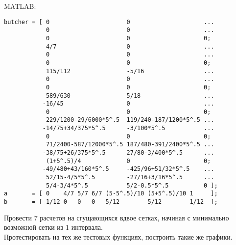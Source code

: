 \documentclass{article}
\begin{document}
\begin{enumerate}
\begin{verbatim}
\end{verbatim}
\newpage
MATLAB:
\begin{matlablisting}
	\begin{verbatim}
butcher = [ 0                      0                     ...
            0                      0                     ...
            0                      0                     0;
            4/7                    0                     ...
            0                      0                     ... 
            0                      0                     0;
            115/112                -5/16                 ...  
            0                      0                     ...
            0                      0                     0;
            589/630                5/18                  ...
           -16/45                  0                     ...
            0                      0                     0;
            229/1200-29/6000*5^.5  119/240-187/1200*5^.5 ...
           -14/75+34/375*5^.5      -3/100*5^.5           ...        
            0                      0                     0;
            71/2400-587/12000*5^.5 187/480-391/2400*5^.5 ...
           -38/75+26/375*5^.5      27/80-3/400*5^.5      ...
            (1+5^.5)/4             0                     0;
           -49/480+43/160*5^.5     -425/96+51/32*5^.5    ...   
            52/15-4/5*5^.5         -27/16+3/16*5^.5      ...
            5/4-3/4*5^.5           5/2-0.5*5^.5          0 ];
a       = [ 0    4/7 5/7 6/7 (5-5^.5)/10 (5+5^.5)/10 1     ];
b       = [ 1/12 0   0   0   5/12        5/12        1/12  ];
	\end{verbatim}
\end{matlablisting}

Провести 7 расчетов на сгущающихся вдвое сетках, начиная с минимально возможной сетки из 1 интервала.\\
Протестировать на тех же тестовых функциях, построить такие же графики.
\end{enumerate}
\end{document}
